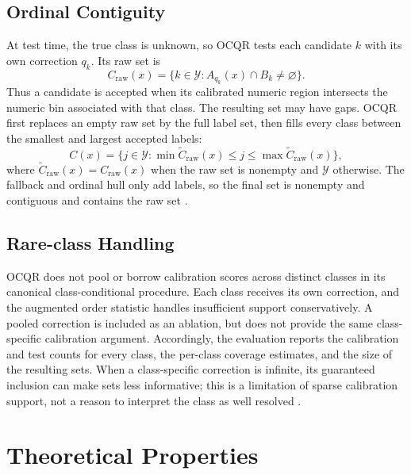 \documentclass[12pt]{report}
\begin{document}
\subsection{Ordinal Contiguity}

At test time, the true class is unknown, so OCQR tests each candidate \(k\) with its own correction \(q_k\). Its raw set is
\begin{equation}
C_{\mathrm{raw}}(x)
=\{k\in\mathcal{Y}:A_{q_k}(x)\cap B_k\neq\varnothing\}.
\label{eq:ocqr-raw-set}
\end{equation}
Thus a candidate is accepted when its calibrated numeric region intersects the numeric bin associated with that class. The resulting set may have gaps. OCQR first replaces an empty raw set by the full label set, then fills every class between the smallest and largest accepted labels:
\begin{equation}
C(x)=\{j\in\mathcal{Y}:\min\widetilde C_{\mathrm{raw}}(x)
\leq j\leq\max\widetilde C_{\mathrm{raw}}(x)\},
\label{eq:ocqr-final-set}
\end{equation}
where \(\widetilde C_{\mathrm{raw}}(x)=C_{\mathrm{raw}}(x)\) when the raw set is nonempty and \(\mathcal{Y}\) otherwise. The fallback and ordinal hull only add labels, so the final set is nonempty and contiguous and contains the raw set \citep{hong2026ocqr}.

\subsection{Rare-class Handling}

OCQR does not pool or borrow calibration scores across distinct classes in its canonical class-conditional procedure. Each class receives its own correction, and the augmented order statistic handles insufficient support conservatively. A pooled correction is included as an ablation, but does not provide the same class-specific calibration argument. Accordingly, the evaluation reports the calibration and test counts for every class, the per-class coverage estimates, and the size of the resulting sets. When a class-specific correction is infinite, its guaranteed inclusion can make sets less informative; this is a limitation of sparse calibration support, not a reason to interpret the class as well resolved \citep{ding2023classconditional,hong2026ocqr}.

\section{Theoretical Properties}
\end{document}
